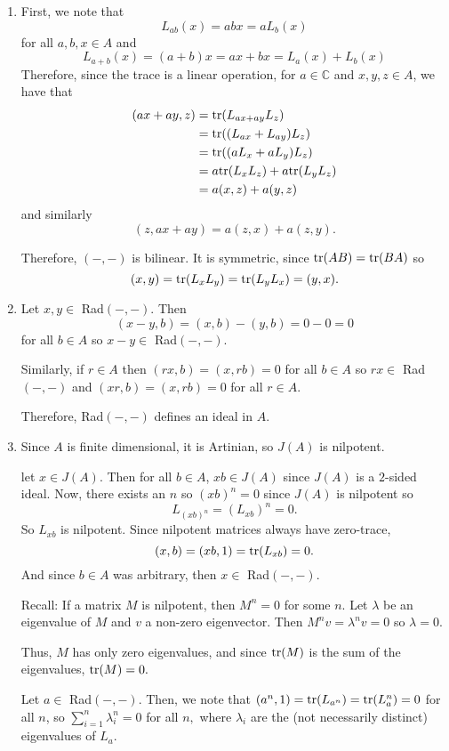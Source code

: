 \documentclass[12pt]{Qual}
\begin{document}
\begin{solution}$\,$
\begin{enumerate}[label=(\alph*)]
    \item First, we note that $$L_{ab}(x)=abx=aL_b(x)$$ for all $a,b,x\in A$ and $$L_{a+b}(x)=(a+b)x=ax+bx=L_a(x)+L_b(x)$$ Therefore, since the trace is a linear operation, for $a\in\mathbb{C}$ and $x,y,z\in A$, we have that \begin{align*}
        (ax+ay,z)&=\text{tr}(L_{ax+ay}L_z)\\
        &=\text{tr}((L_{ax}+L_{ay})L_z)\\
        &=\text{tr}((aL_x+aL_y)L_z)\\
        &=a\text{tr}(L_xL_z)+a\text{tr}(L_yL_z)\\
        &=a(x,z)+a(y,z)
    \end{align*} and similarly $$(z,ax+ay)=a(z,x)+a(z,y).$$

    Therefore, $(-,-)$ is bilinear. It is symmetric, since $\text{tr}(AB)=\text{tr}(BA)$ so $$(x,y)=\text{tr}(L_xL_y)=\text{tr}(L_yL_x)=(y,x).$$
    \item Let $x,y\in $ Rad$(-,-)$. Then $$(x-y,b)=(x,b)-(y,b)=0-0=0$$ for all $b\in A$ so $x-y\in $ Rad$(-,-)$.

    Similarly, if $r\in A$ then $(rx,b)=(x,rb)=0$ for all $b\in A$ so $rx\in $ Rad$(-,-)$ and $(xr,b)=(x,rb)=0$ for all $r\in A$.

    Therefore, Rad$(-,-)$ defines an ideal in $A$.

    \item Since $A$ is finite dimensional, it is Artinian, so $J(A)$ is nilpotent.

    let $x\in J(A)$. Then for all $b\in A$, $xb\in J(A)$ since $J(A)$ is a $2$-sided ideal. Now, there exists an $n$ so $(xb)^n=0$ since $J(A)$ is nilpotent so $$L_{(xb)^n}=(L_{xb})^n=0.$$ So $L_{xb}$ is nilpotent. Since nilpotent matrices always have zero-trace, $$(x,b)=(xb,1)=\text{tr}(L_{xb})=0.$$ And since $b\in A$ was arbitrary, then $x\in $ Rad$(-,-)$.

    \begin{mybox}
    Recall: If a matrix $M$ is nilpotent, then $M^n=0$ for some $n$. Let $\lambda$ be an eigenvalue of $M$ and $v$ a non-zero eigenvector. Then $M^nv=\lambda^nv=0$ so $\lambda=0$.

    Thus, $M$ has only zero eigenvalues, and since $\text{tr}(M)$ is the sum of the eigenvalues, $\text{tr}(M)=0.$
    \end{mybox}

    Let $a\in$ Rad$(-,-)$. Then, we note that $(a^n,1)=\text{tr}(L_{a^n})=\text{tr}(L_a^n)=0$ for all $n$, so $\sum_{i=1}^n\lambda_i^n=0$ for all $n,$ where $\lambda_i$ are the (not necessarily distinct) eigenvalues of $L_a$.


\end{enumerate}
\end{solution}
\end{document}
